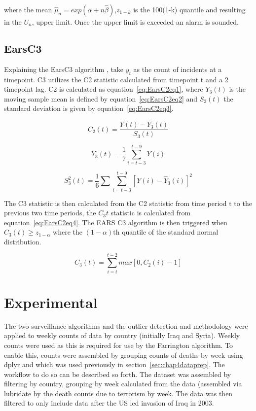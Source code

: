 where the mean $\hat{\mu}_{n}=exp(\!\hat{\alpha}+n\hat{\beta})$,$z_{1-k}$ is the 100(1-k) quantile and resulting in the $U_{n}$, upper limit. Once the upper limit is exceeded an alarm is sounded.


\subsection{EarsC3}

Explaining the EarsC3 algorithm \citep{stacey2007comparison}, take $y_{t}$ as the count of incidents at a timepoint. C3 utilizes the C2 statistic calculated from timepoint t and a 2 timepoint lag. C2 is calculated as equation~\ref{eq:EarsC2eq1}, where $\bar{Y}_{3}(t)$  is the moving sample mean is defined by equation~\ref{eq:EarsC2eq2} and $S_{3}(t)$ the standard deviation is given by equation~\ref{eq:EarsC2eq3}.

\begin{equation} 
C_{2}(t)=\frac{Y(t)-\bar{Y}_{3}(t)}{S_{3}(t)}
\label{eq:EarsC2eq1}  \end{equation}

\begin{equation} 
\bar{Y}_{3}(t)=\frac{1}{7}\sum_{i=t-3}^{t-9}Y(i)
\label{eq:EarsC2eq2}  \end{equation}

\begin{equation} 
S^{2}_{3}(t)=\frac{1}{6}\sum \sum_{i=t-3}^{t-9}[Y(i)-\hat{Y}_{3}(i)]^{2}
\label{eq:EarsC2eq3}  \end{equation}

The C3 statistic is then calculated from the C2 statistic from time period t to the previous two time periods, the $C_{3}t$ statistic is calculated from equation~\ref{eq:EarsC2eq4}. The EARS C3  algorithm is then triggered when $C_3(t) \geq z_{1-\alpha}$ where the $(1-\alpha)$th quantile of the standard normal distribution.

\begin{equation} 
C_{3}(t)=\sum_{i=t}^{t-2}max[0,C_{2}(i)-1]
\label{eq:EarsC2eq4}  \end{equation}

\section{Experimental}
The two surveillance algorithms and the outlier detection and methodology were applied to weekly counts of data by country (initially Iraq and Syria). Weekly counts were used as this is required for use by the Farrington algorithm. To enable this, counts were assembled by grouping counts of deaths by week using dplyr \citep{wickham2015dplyr} and which was used previously in section~\ref{sec:chap4dataprep}. The workflow to do so can be described so forth. The dataset was assembled by filtering by country, grouping by week calculated from the data (assembled via lubridate by \citep{grolemund2011dates} the death counts due to terrorism by week. The data was then filtered to only include data after the US led invasion of Iraq in 2003.

